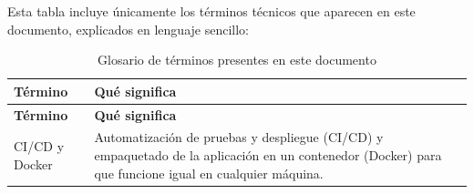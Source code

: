 Esta tabla incluye únicamente los términos técnicos que aparecen en este
documento, explicados en lenguaje sencillo:

\begingroup
\small
\setlength{\tabcolsep}{3pt}
\begin{longtable}{>{\raggedright\arraybackslash}p{4.3cm}>{\raggedright\arraybackslash}p{9.8cm}}
\caption{Glosario de términos presentes en este documento}
\label{tab:glosario}\\
\toprule
\textbf{Término} & \textbf{Qué significa} \\
\midrule
\endfirsthead
\toprule
\textbf{Término} & \textbf{Qué significa} \\
\midrule
\endhead
    CI/CD y Docker & Automatización de pruebas y despliegue (CI/CD) y empaquetado de la aplicación en un contenedor (Docker) para que funcione igual en cualquier máquina.
 \\
\bottomrule
\end{longtable}
\endgroup

